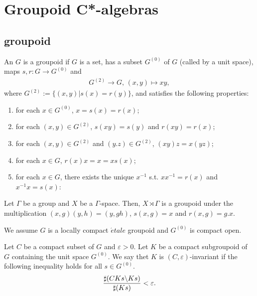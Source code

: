 \section{Groupoid C*-algebras}
\subsection{groupoid}

\begin{definition}
  An $G$ is a groupoid
  if $G$ is a set, has a subset $G^{(0)}$ of $G$ (called by a unit space),
  maps $s,r:G \rightarrow G^{(0)}$ and
  \begin{align*}
    G^{(2)} \rightarrow G,\, (x,y) \mapsto xy, 
  \end{align*}
  where $G^{(2)} := \{(x,y)|s(x)=r(y)\}$,
  and satisfies the following properties:
  \begin{enumerate}
  \item for each $x \in G^{(0)}$, $x =s(x) = r(x)$;
  \item for each $(x,y)\in G^{(2)}$, $s(xy) = s(y)$ and $r(xy) = r(x)$;
  \item for each $(x,y) \in G^{(2)}$ and $(y.z) \in G^{(2)}$, $(xy)z = x(yz)$;
  \item for each $x \in G$, $r(x)x = x = x s(x)$;
  \item for each $x \in G$, there exists the unique $x^{-1}$ s.t. $xx^{-1} = r(x)$ and $x^{-1} x = s(x)$:
  \end{enumerate}
\end{definition}

\begin{remark}
  Let $\Gamma$ be a group and $X$ be a $\Gamma$-space.
  Then, $X \rtimes \Gamma$ is a groupoid under the multiplication $(x,g)(y,h) = (y,gh)$,
  $s(x,g)= x$ and $r(x,g) = g.x$.
\end{remark}

We assume $G$ is a locally compact $\acute{e}tale$ groupoid and $G^{(0)}$ is compact open.
\begin{definition}
  Let $C$ be a compact subset of $G$ and $\varepsilon > 0$.
  Let $K$ be a compact subgroupoid of $G$ containing the unit space $G^{(0)}$.
  We say thet $K$ is $(C,\varepsilon)$-invariant if the following inequality holds for all $s \in G^{(0)}$.
  \begin{align*}
    \frac{\sharp(CKs\backslash Ks)}{\sharp(Ks)} < \varepsilon.
  \end{align*}
\end{definition}

